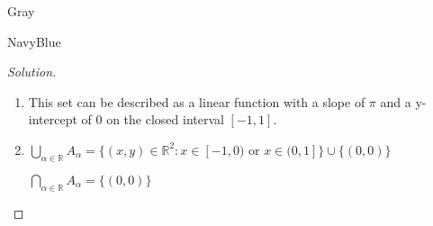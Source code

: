 \documentclass[12pt]{amsart}
\theoremstyle{named}
\newenvironment{soln}
{\begin{color}{Gray}\begin{framed}\begin{color}{NavyBlue}\begin{proof}[Solution]
\doublespacing}
{\end{proof}\end{color}\end{framed}\end{color}}
\theoremstyle{definition}
\newcommand{\R}{\mathbb R}
\begin{document}
\begin{soln}
	\phantom{ }
	\begin{enumerate}
		\item This set can be described as a linear function with a slope of $\pi$ and a y-intercept of $0$
		on the closed interval $[-1,1]$.

		\item $\displaystyle\bigcup_{\alpha\in\R} A_\alpha = \{(x,y) \in \mathbb R^2 : x \in  [-1,0) \text{ or } x \in (0,1]\} \cup \{(0,0)\}$
		
		
		
		\noindent $\displaystyle\bigcap_{\alpha\in\R} A_\alpha = \{(0,0)\}$

		
	\end{enumerate}
	
\end{soln}
\end{document}
